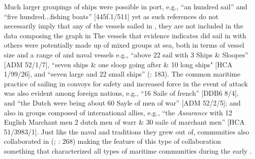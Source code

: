 Much larger groupings of ships were possible in port, e.g., “an hundred sail” and “five hundred...fishing boats” [445f.1/511] yet as such references do not necessarily imply that any of the vessels sailed in , they are not included in the data composing the graph in  The vessels that evidence indicates did sail in  with others were potentially made up of mixed groups at sea, both in terms of vessel size and a range of  and naval vessels e.g., “above 22 sail with 3  Ships \& Sloopes” [ADM 52/1/7], “seven ships \& one sloop going after \& 10 long ships" [HCA 1/99/26], and “seven large and 22 small ships” (\citealt{Bicheno2012}: 183). The common maritime practice of sailing in convoys for safety and increased force in the event of attack was also evident among foreign nations, e.g., “16 Saile of french” [DDB6 8/4], and “the Dutch were being about 60 Sayle of men of war” [ADM 52/2/5]; and also in groups composed of international allies, e.g., “the \textit{Assurance} with 12 English Marchant men 2 dutch men of warr \& 30 saile of marchant men” [HCA 51/3983/1]. Just like the naval and  traditions they grew out of,  communities also collaborated in  (\citealt{Esquemelin1678}; \citealt{Rediker1987}: 268) making the feature of this type of collaboration something that characterized all types of  maritime communities during the early . 

